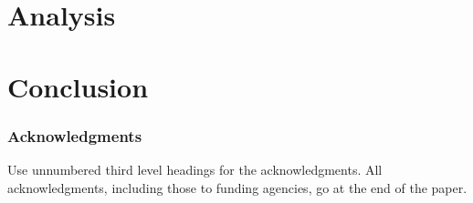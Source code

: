 \documentclass{article} %
\begin{document}
\section{Analysis}


\section{Conclusion}



\subsubsection*{Acknowledgments}

Use unnumbered third level headings for the acknowledgments. All
acknowledgments, including those to funding agencies, go at the end of the paper.




\end{document}
